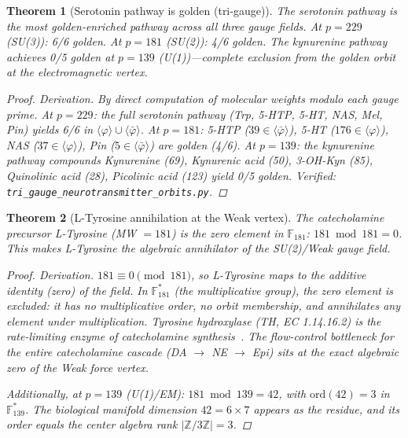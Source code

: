 \documentclass[12pt,oneside]{article}
\theoremstyle{principia}
\newtheorem{theorem}{Theorem}[section]
\theoremstyle{definition}
\theoremstyle{remark}
\providecommand{\vp}{\varphi}
\providecommand{\vpbar}{\bar{\varphi}}
\begin{document}
\begin{theorem}[Serotonin pathway is golden (tri-gauge)]
\label{thm:serotonin_golden}
The serotonin pathway is the most golden-enriched pathway across all three gauge fields. At $p = 229$ (SU(3)): 6/6 golden. At $p = 181$ (SU(2)): 4/6 golden. The kynurenine pathway achieves 0/5 golden at $p = 139$ (U(1))---complete exclusion from the golden orbit at the electromagnetic vertex.
\begin{proof}
\emph{Derivation.} By direct computation of molecular weights modulo each gauge prime. At $p=229$: the full serotonin pathway (Trp, 5-HTP, 5-HT, NAS, Mel, Pin) yields 6/6 in $\langle\vp\rangle \cup \langle\vpbar\rangle$. At $p=181$: 5-HTP ($39 \in \langle\vpbar\rangle$), 5-HT ($176 \in \langle\vp\rangle$), NAS ($37 \in \langle\vp\rangle$), Pin ($5 \in \langle\vpbar\rangle$) are golden (4/6). At $p=139$: the kynurenine pathway compounds Kynurenine (69), Kynurenic acid (50), 3-OH-Kyn (85), Quinolinic acid (28), Picolinic acid (123) yield 0/5 golden. Verified: \texttt{tri\_gauge\_neurotransmitter\_orbits.py}.
\qedhere
\end{proof}
\end{theorem}

\begin{theorem}[L-Tyrosine annihilation at the Weak vertex]
\label{thm:tyrosine_annihilation}
The catecholamine precursor L-Tyrosine (MW $= 181$) is the zero element in $\mathbb{F}_{181}$: $181 \bmod 181 = 0$. This makes L-Tyrosine the algebraic annihilator of the SU(2)/Weak gauge field.
\begin{proof}
\emph{Derivation.} $181 \equiv 0 \pmod{181}$, so L-Tyrosine maps to the additive identity (zero) of the field. In $\mathbb{F}_{181}^*$ (the multiplicative group), the zero element is excluded: it has no multiplicative order, no orbit membership, and annihilates any element under multiplication. Tyrosine hydroxylase (TH, EC 1.14.16.2) is the rate-limiting enzyme of catecholamine synthesis~\cite{nagatsu64}. The flow-control bottleneck for the entire catecholamine cascade (DA $\to$ NE $\to$ Epi) sits at the exact algebraic zero of the Weak force vertex.

Additionally, at $p = 139$ (U(1)/EM): $181 \bmod 139 = 42$, with $\mathrm{ord}(42) = 3$ in $\mathbb{F}_{139}^*$. The biological manifold dimension $42 = 6 \times 7$ appears as the residue, and its order equals the center algebra rank $|\mathbb{Z}/3\mathbb{Z}| = 3$.
\qedhere
\end{proof}
\end{theorem}
\end{document}
